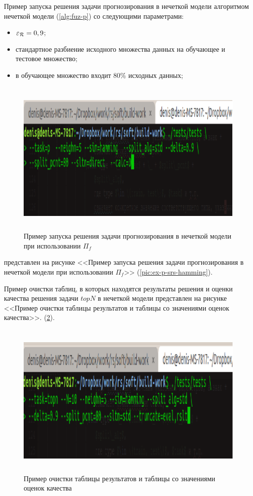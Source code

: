 Пример запуска решения задачи прогнозирования в нечеткой модели
алгоритмом нечеткой модели (\ref{alg:fuz-p}) со следующими параметрами:
\begin{itemize}
	\item $\varepsilon_{\mathcal{R}} = 0,9$;
	\item стандартное разбиение исходного множества данных на обучающее и
		тестовое множество;
	\item в обучающее множество входит 80\% исходных данных;
\end{itemize}
\begin{figure}[H]
	\caption{Пример запуска решения задачи прогнозирования в нечеткой модели при
	использовании $\Pi_f$}
	\label{pic:ex-p-srs-fuz}
	\begin{center}
  \includegraphics[width=7in,height=3in]{pics/examples/p-fuz.png}
\end{center}
\end{figure}
представлен на рисунке <<Пример запуска решения задачи прогнозирования в нечеткой модели при
	использовании $\Pi_f$>> (\ref{pic:ex-p-srs-hamming}).

Пример очистки таблиц, в которых находятся результаты решения и оценки качества
решения задачи $topN$ в нечеткой модели представлен на рисунке <<Пример очистки
таблицы результатов и таблицы со значениями оценок качества>>.
(\ref{pic:truncate}).
\begin{figure}[H]
	\caption{Пример очистки таблицы результатов и таблицы со значениями оценок качества}
	\label{pic:truncate}
	\begin{center}
  \includegraphics[width=7in,height=3in]{pics/examples/truncate.png}
\end{center}
\end{figure}

